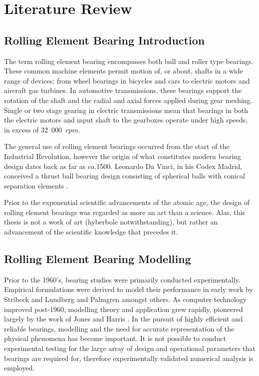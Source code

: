\chapter{Literature Review}
\label{Literature Review}

\section{Rolling Element Bearing Introduction}

The term rolling element bearing encompasses both ball and roller type bearings. These common machine elements permit motion of, or about, shafts in a wide range of devices; from wheel bearings in bicycles and cars to electric motors and aircraft gas turbines. In automotive transmissions, these bearings support the rotation of the shaft and the radial and axial forces applied during gear meshing. Single or two stage gearing in electric transmissions mean that bearings in both the electric motors and input shaft to the gearboxes operate under high speeds, in excess of 32~000~$rpm$.

The general use of rolling element bearings occurred from the start of the Industrial Revolution, however the origin of what constitutes modern bearing design dates back as far as $ca.$1500. Leonardo Da Vinci, in his Codex Madrid, conceived a thrust ball bearing design consisting of spherical balls with conical separation elements \cite{Harris2007}.

Prior to the exponential scientific advancements of the atomic age, the design of rolling element bearings was regarded as more an art than a science. Alas, this thesis is not a work of art (hyberbole notwithstanding), but rather an advancement of the scientific knowledge that precedes it.

\section{Rolling Element Bearing Modelling}

Prior to the 1960’s, bearing studies were primarily conducted experimentally. Empirical formulations were derived to model their performance in early work by Stribeck \cite{Stribeck1907} and Lundberg and Palmgren \cite{Lundberg1952} \cite{Palmgren1959} amongst others. As computer technology improved post-1960, modelling theory and application grew rapidly, pioneered largely by the work of Jones \cite{Jones1960} and Harris \cite{Harris1984}. In the pursuit of highly efficient and reliable bearings, modelling and the need for accurate representation of the physical phenomena has become important. It is not possible to conduct experimental testing for the large array of design and operational parameters that bearings are required for, therefore experimentally validated numerical analysis is employed.

